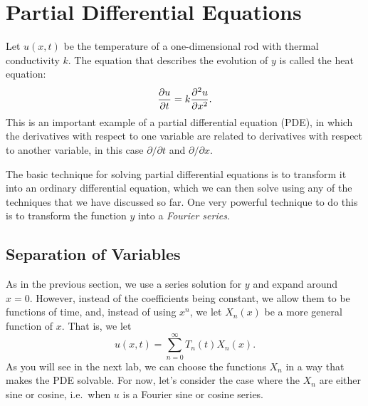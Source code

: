 \documentclass[12pt]{book}
\begin{document}
\chapter{Partial Differential Equations}
Let $u(x,t)$ be the temperature of a one-dimensional rod with thermal
conductivity $k$. The equation that describes the evolution of $y$ is
called the heat equation:
\begin{dmath*}
  \pp{u}{t} =  k\pptwo{u}{x}.
\end{dmath*}
This is an important example of a partial differential equation (PDE),
in which the derivatives with respect to one variable are related to
derivatives with respect to another variable, in this case
$\partial/\partial t$ and $\partial/\partial x$.

The basic technique for solving partial differential equations is to
transform it into an ordinary differential equation, which we can then
solve using any of the techniques that we have discussed so far. One
very powerful technique to do this is to transform the function $y$
into a \emph{Fourier series}.

\section{Separation of Variables}
As in the previous section, we use a series solution for $y$ and
expand around $x=0$. However, instead of the coefficients being
constant, we allow them to be functions of time, and, instead of using
$x^n$, we let $X_n(x)$ be a more general function of $x$. That is, we
let
\begin{dmath*}
  \boxed{u(x,t) = \sum_{n=0}^\infty T_n(t) X_n(x)}.
\end{dmath*}
As you will see in the next lab, we can choose the functions $X_n$ in
a way that makes the PDE solvable. For now, let's consider the case
where the $X_n$ are either sine or cosine, i.e.\ when $u$ is a Fourier
sine or cosine series.
\end{document}
